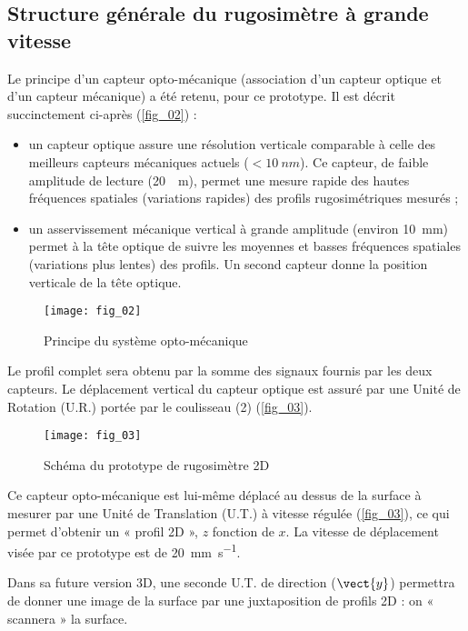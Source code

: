 \subsection{Structure générale du rugosimètre à grande vitesse}

Le principe d’un capteur opto-mécanique (association d’un capteur optique et d’un capteur mécanique) a
été retenu, pour ce prototype. Il est décrit succinctement ci-après (\autoref{fig_02}) :
\begin{itemize}
\item un capteur optique assure une résolution verticale comparable à celle des meilleurs capteurs mécaniques actuels ($< \SI{10}{nm}$). Ce capteur, de faible amplitude de lecture (\SI{20}{\mu m}), permet une mesure rapide des hautes fréquences spatiales (variations rapides) des profils rugosimétriques mesurés ;
\item un asservissement mécanique vertical à grande amplitude (environ \SI{10}{mm}) permet à la tête optique de suivre les moyennes et basses fréquences spatiales (variations plus lentes) des profils. Un second capteur donne la position verticale de la tête optique.
\end{itemize}


\begin{figure}[H]
\centering
\texttt{[image: fig\_02]}
\caption{\label{fig_02} Principe du système opto-mécanique}
\end{figure}

Le profil complet sera obtenu par la somme des signaux fournis par les deux capteurs. Le déplacement
vertical du capteur optique est assuré par une Unité de Rotation (U.R.) portée par le coulisseau (2)
(\autoref{fig_03}).

\begin{figure}[H]
\centering
\texttt{[image: fig\_03]}
\caption{\label{fig_03} Schéma du prototype de rugosimètre 2D}
\end{figure}

Ce capteur opto-mécanique est lui-même déplacé au dessus de la surface à mesurer par une Unité de
Translation (U.T.) à vitesse régulée (\autoref{fig_03}), ce qui permet d’obtenir un « profil 2D », $z$ fonction de $x$. La
vitesse de déplacement visée par ce prototype est de \SI{20}{mm.s^{-1}}.

Dans sa future version 3D, une seconde U.T. de direction ($\vect{y}$) permettra de donner une image de la surface
par une juxtaposition de profils 2D : on « scannera » la surface.


